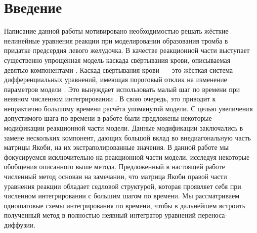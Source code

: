 \chapter{Введение}
\label{chapter:introduction} 

Написание данной работы мотивировано необходимостью решать жёсткие нелинейные уравнения реакции при моделировании образования тромба в придатке предсердия левого желудочка.
В качестве реакционной части выступает существенно упрощённая модель каскада свёртывания крови, описываемая девятью компонентами \cite{bouchnita2020mathematical}.
Каскад свёртывания крови~--- это жёсткая система дифференциальных уравнений, имеющая пороговый отклик на изменение параметров модели \cite{shen2008threshold}.
Это вынуждает использовать малый шаг по времени при неявном численном интегрировании \cite{douglas1967generalizedrk}.
В свою очередь, это приводит к непрактично большому времени расчёта упомянутой модели.
С целью увеличения допустимого шага по времени в работе \cite{vassilevski2020parallel} были предложены некоторые модификации реакционной части модели.
Данные модификации заключались в замене нескольких компонент, дающих большой вклад во внедиагональную часть матрицы Якоби, на их экстраполированные значения.
В данной работе мы фокусируемся исключительно на реакционной части модели, исследуя некоторые обобщения описанного выше метода.
Предложенный в настоящей работе численный метод основан на замечании, что матрица Якоби правой части уравнения реакции обладает седловой структурой,
которая проявляет себя при численном интегрировании с большим шагом по времени.
Мы рассматриваем одношаговые схемы интегрирования по времени, чтобы в дальнейшем встроить полученный метод в полностью неявный интегратор уравнений переноса-диффузии.

